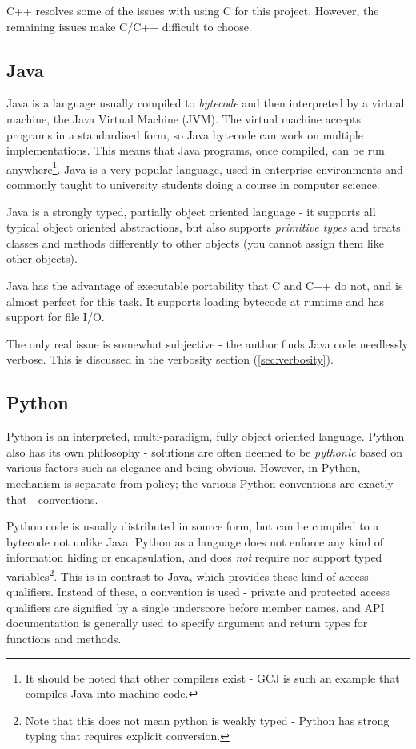 \documentclass[10pt,a4paper,notitlepage,twoside]{report}
\begin{document}
C++ resolves some of the issues with using C for this project. However, the remaining issues make C/C++ difficult to choose.

\subsection{Java}
Java is a language usually compiled to \emph{bytecode} and then interpreted by a virtual machine, the Java Virtual Machine (JVM). The virtual machine accepts programs in a standardised form, so Java bytecode can work on multiple implementations. This means that Java programs, once compiled, can be run anywhere\footnote{It should be noted that other compilers exist - GCJ\cite{gcj} is such an example that compiles Java into machine code.}. Java is a very popular language\cite{javatech}, used in enterprise environments and commonly taught to university students doing a course in computer science.

Java is a strongly typed, partially object oriented language - it supports all typical object oriented abstractions, but also supports \emph{primitive types} and treats classes and methods differently to other objects (you cannot assign them like other objects).

Java has the advantage of executable portability that C and C++ do not, and is almost perfect for this task. It supports loading bytecode at runtime and has support for file I/O.

The only real issue is somewhat subjective - the author finds Java code needlessly verbose. This is discussed in the verbosity section (\ref{sec:verbosity}).

\subsection{Python}
Python is an interpreted, multi-paradigm, fully object oriented language. Python also has its own philosophy - solutions are often deemed to be \emph{pythonic} based on various factors such as elegance and being obvious. However, in Python, mechanism is separate from policy; the various Python conventions are exactly that - conventions.

Python code is usually distributed in source form, but can be compiled to a bytecode not unlike Java. Python as a language does not enforce any kind of information hiding or encapsulation, and does \emph{not} require nor support typed variables\footnote{Note that this does not mean python is weakly typed -  Python has strong typing that requires explicit conversion.}. This is in contrast to Java, which provides these kind of access qualifiers. Instead of these, a convention is used - private and protected access qualifiers are signified by a single underscore before member names, and API documentation is generally used to specify argument and return types for functions and methods.
\end{document}

